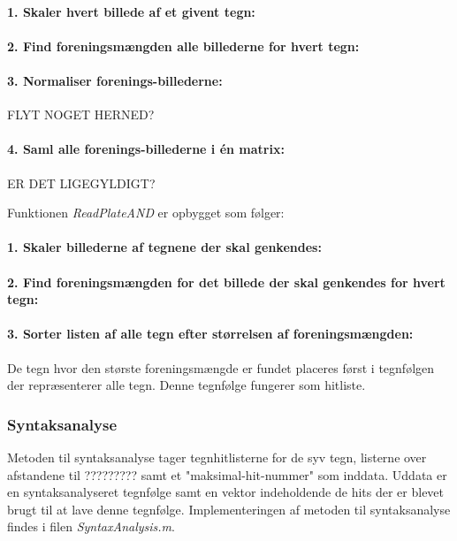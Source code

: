 \paragraph{1. Skaler hvert billede af et givent tegn:}

\paragraph{2. Find foreningsmængden alle billederne for hvert tegn:}

\paragraph{3. Normaliser forenings-billederne:} FLYT NOGET HERNED?

\paragraph{4. Saml alle forenings-billederne i én matrix:} ER DET LIGEGYLDIGT?

Funktionen \textit{ReadPlateAND} er opbygget som følger:

\paragraph{1. Skaler billederne af tegnene der skal genkendes:}

\paragraph{2. Find foreningsmængden for det billede der skal genkendes for hvert tegn:}

\paragraph{3. Sorter listen af alle tegn efter størrelsen af foreningsmængden:} De tegn hvor den største foreningsmængde er fundet placeres først i tegnfølgen der repræsenterer alle tegn. Denne tegnfølge fungerer som hitliste.

\subsubsection{Syntaksanalyse}

Metoden til syntaksanalyse tager tegnhitlisterne for de syv tegn, listerne over afstandene til ????????? samt et "maksimal-hit-nummer" som inddata. Uddata er en syntaksanalyseret tegnfølge samt en vektor indeholdende de hits der er blevet brugt til at lave denne tegnfølge. Implementeringen af metoden til syntaksanalyse findes i filen \textit{SyntaxAnalysis.m}.

